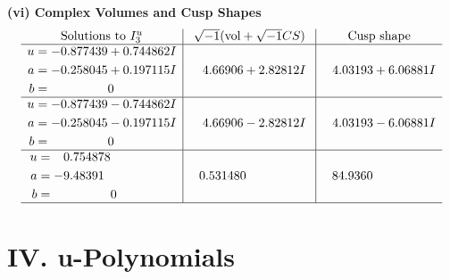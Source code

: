 \documentclass[1p]{elsarticle_modified}
\theoremstyle{definition}
\newcommand{\I}{\sqrt{-1}}
\begin{document}
\newpage\flushleft \textbf{(vi) Complex Volumes and Cusp Shapes}
$$\begin{array}{c|c|c}  
\text{Solutions to }I^u_{3}& \I (\text{vol} + \sqrt{-1}CS) & \text{Cusp shape}\\
 \hline 
\begin{aligned}
u &= -0.877439 + 0.744862 I \\
a &= -0.258045 + 0.197115 I \\
b &= \phantom{-0.000000 } 0\end{aligned}
 & \phantom{-}4.66906 + 2.82812 I & \phantom{-}4.03193 + 6.06881 I \\ \hline\begin{aligned}
u &= -0.877439 - 0.744862 I \\
a &= -0.258045 - 0.197115 I \\
b &= \phantom{-0.000000 } 0\end{aligned}
 & \phantom{-}4.66906 - 2.82812 I & \phantom{-}4.03193 - 6.06881 I \\ \hline\begin{aligned}
u &= \phantom{-}0.754878\phantom{ +0.000000I} \\
a &= -9.48391\phantom{ +0.000000I} \\
b &= \phantom{-0.000000 } 0\end{aligned}
 & \phantom{-}0.531480\phantom{ +0.000000I} & \phantom{-}84.9360\phantom{ +0.000000I}\\
 \hline 
 \end{array}$$\newpage
\newpage\renewcommand{\arraystretch}{1}
\centering \section*{ IV. u-Polynomials}
\end{document}
